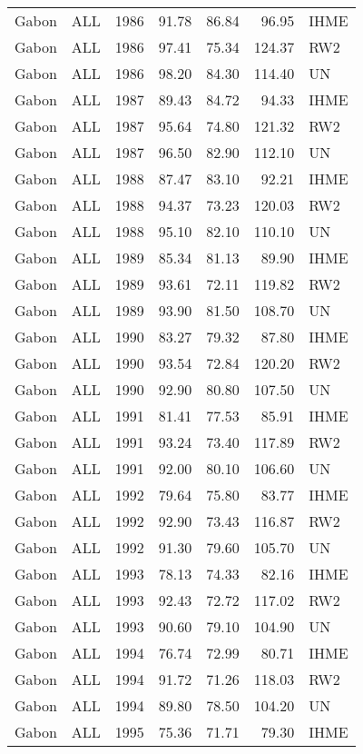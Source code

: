 \begin{longtable}{lllrrrl}
  Gabon & ALL & 1986 & 91.78 & 86.84 & 96.95 & IHME \\ 
  Gabon & ALL & 1986 & 97.41 & 75.34 & 124.37 & RW2 \\ 
  Gabon & ALL & 1986 & 98.20 & 84.30 & 114.40 & UN \\ 
  Gabon & ALL & 1987 & 89.43 & 84.72 & 94.33 & IHME \\ 
  Gabon & ALL & 1987 & 95.64 & 74.80 & 121.32 & RW2 \\ 
  Gabon & ALL & 1987 & 96.50 & 82.90 & 112.10 & UN \\ 
  Gabon & ALL & 1988 & 87.47 & 83.10 & 92.21 & IHME \\ 
  Gabon & ALL & 1988 & 94.37 & 73.23 & 120.03 & RW2 \\ 
  Gabon & ALL & 1988 & 95.10 & 82.10 & 110.10 & UN \\ 
  Gabon & ALL & 1989 & 85.34 & 81.13 & 89.90 & IHME \\ 
  Gabon & ALL & 1989 & 93.61 & 72.11 & 119.82 & RW2 \\ 
  Gabon & ALL & 1989 & 93.90 & 81.50 & 108.70 & UN \\ 
  Gabon & ALL & 1990 & 83.27 & 79.32 & 87.80 & IHME \\ 
  Gabon & ALL & 1990 & 93.54 & 72.84 & 120.20 & RW2 \\ 
  Gabon & ALL & 1990 & 92.90 & 80.80 & 107.50 & UN \\ 
  Gabon & ALL & 1991 & 81.41 & 77.53 & 85.91 & IHME \\ 
  Gabon & ALL & 1991 & 93.24 & 73.40 & 117.89 & RW2 \\ 
  Gabon & ALL & 1991 & 92.00 & 80.10 & 106.60 & UN \\ 
  Gabon & ALL & 1992 & 79.64 & 75.80 & 83.77 & IHME \\ 
  Gabon & ALL & 1992 & 92.90 & 73.43 & 116.87 & RW2 \\ 
  Gabon & ALL & 1992 & 91.30 & 79.60 & 105.70 & UN \\ 
  Gabon & ALL & 1993 & 78.13 & 74.33 & 82.16 & IHME \\ 
  Gabon & ALL & 1993 & 92.43 & 72.72 & 117.02 & RW2 \\ 
  Gabon & ALL & 1993 & 90.60 & 79.10 & 104.90 & UN \\ 
  Gabon & ALL & 1994 & 76.74 & 72.99 & 80.71 & IHME \\ 
  Gabon & ALL & 1994 & 91.72 & 71.26 & 118.03 & RW2 \\ 
  Gabon & ALL & 1994 & 89.80 & 78.50 & 104.20 & UN \\ 
  Gabon & ALL & 1995 & 75.36 & 71.71 & 79.30 & IHME \\ 

\end{longtable}
